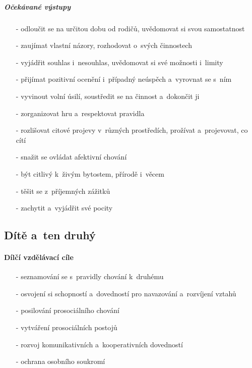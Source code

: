 					\subparagraph{Očekávané výstupy}

					\begin{itemize}
					\setlength\itemsep{-2mm}
						\item[-]odloučit se na určitou dobu od rodičů, uvědomovat si svou samostatnost
						\item[-]zaujímat vlastní názory, rozhodovat o~svých činnostech
						\item[-]vyjádřit souhlas i~nesouhlas, uvědomovat si své možnosti i~limity
						\item[-]přijímat pozitivní ocenění i~případný neúspěch a~vyrovnat se s~ním
						\item[-]vyvinout volní úsilí, soustředit se na činnost a~dokončit ji
						\item[-]zorganizovat hru a~respektovat pravidla
						\item[-]rozlišovat citové projevy v~různých prostředích, prožívat a~projevovat, co cítí
						\item[-]snažit se ovládat afektivní chování
						\item[-]být citlivý k~živým bytostem, přírodě i~věcem
						\item[-]těšit se z~příjemných zážitků
						\item[-]zachytit a~vyjádřit své pocity
					\end{itemize}

			\subsection{Dítě a~ten druhý}
				\textit{} \citep[s.~24]{RVP}

					\paragraph{Dílčí vzdělávací cíle}

					\begin{itemize}
					\setlength\itemsep{-2mm}
						\item[-]seznamování se s~pravidly chování k~druhému
						\item[-]osvojení si schopností a~dovedností pro navazování a~rozvíjení vztahů
						\item[-]posilování prosociálního chování
						\item[-]vytváření prosociálních postojů
						\item[-]rozvoj komunikativních a~kooperativních dovedností
						\item[-]ochrana osobního soukromí
					\end{itemize}
					
